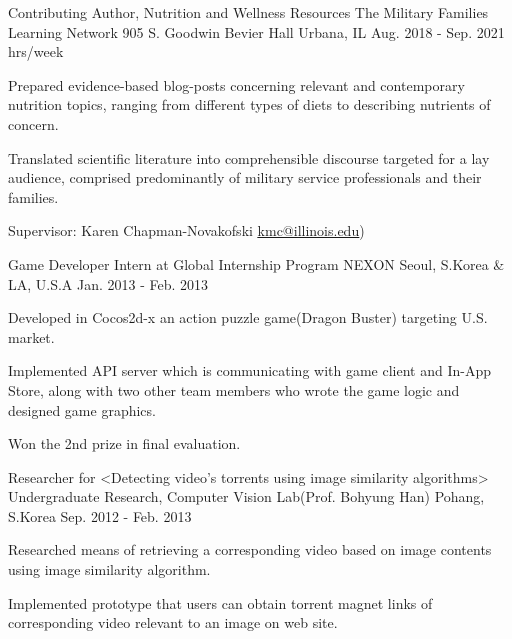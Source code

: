 \begin{cventries}

  \cventry
    {Contributing Author, Nutrition and Wellness Resources } %
    {The Military Families Learning Network } %
    {905 S. Goodwin  Bevier Hall \newline
    Urbana, IL} %
    {Aug. 2018 - Sep. 2021  hrs/week} %
    {
      \begin{cvitems} %
        \item {Prepared evidence-based blog-posts concerning relevant and contemporary nutrition topics, ranging from different types of diets to describing nutrients of concern.}
        \item {Translated scientific literature into comprehensible discourse targeted for a lay audience, comprised predominantly of military service professionals and their families.}
        \item {Supervisor: Karen Chapman-Novakofski \textcolor{navyblue}{\underline{\href{mailto:kmc@illinois.edu}{kmc@illinois.edu}}})}
      \end{cvitems}
    }


  \cventry
    {Game Developer Intern at Global Internship Program} %
    {NEXON} %
    {Seoul, S.Korea \& LA, U.S.A} %
    {Jan. 2013 - Feb. 2013} %
    {
      \begin{cvitems} %
        \item {Developed in Cocos2d-x an action puzzle game(Dragon Buster) targeting U.S. market.}
        \item {Implemented API server which is communicating with game client and In-App Store, along with two other team members who wrote the game logic and designed game graphics.}
        \item {Won the 2nd prize in final evaluation.}
      \end{cvitems}
    }

  \cventry
    {Researcher for <Detecting video’s torrents using image similarity algorithms>} %
    {Undergraduate Research, Computer Vision Lab(Prof. Bohyung Han)} %
    {Pohang, S.Korea} %
    {Sep. 2012 - Feb. 2013} %
    {
      \begin{cvitems} %
        \item {Researched means of retrieving a corresponding video based on image contents using image similarity algorithm.}
        \item {Implemented prototype that users can obtain torrent magnet links of corresponding video relevant to an image on web site.}
      \end{cvitems}
    }


\end{cventries}
